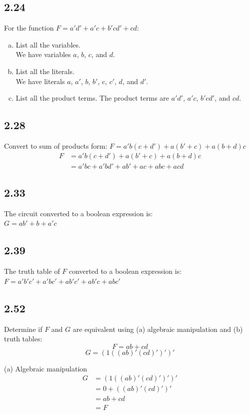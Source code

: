 \documentclass{article}
\begin{document}
\subsection*{2.24}
For the function $F = a'd' + a'c + b'cd' + cd$:
\begin{enumerate}[(a)]
    \item List all the variables. \\
    We have variables $a$, $b$, $c$, and $d$.
    \item List all the literals. \\
    We have literals $a$, $a'$, $b$, $b'$, $c$, $c'$, $d$, and $d'$.
    \item List all the product terms.
    The product terms are $a'd'$, $a'c$, $b'cd'$, and $cd$.
\end{enumerate}

\subsection*{2.28}
Convert to sum of products form: $F = a'b(c + d') + a(b' + c) + a(b + d)c$
\begin{align*}
    F &= a'b(c + d') + a(b' + c) + a(b + d)c \\
    &= a'bc + a'bd' + ab' + ac + abc + acd
\end{align*}

\subsection*{2.33}
The circuit converted to a boolean expression is: \\
$ G = ab' + b + a'c $

\subsection*{2.39}
The truth table of $F$ converted to a boolean expression is: \\
$ F = a'b'c' + a'bc' + ab'c' + ab'c + abc' $

\subsection*{2.52}
Determine if $F$ and $G$ are equivalent using (a) algebraic manipulation and (b) truth tables: \\
$$ F = ab + cd $$
$$ G = (1((ab)'(cd)')')' $$

\noindent (a) Algebraic manipulation \\
\begin{align*}
    G &= (1((ab)'(cd)')')' \\
    &= 0 + ((ab)'(cd)')' \\
    &= ab + cd \\
    &= F
\end{align*}
\end{document}
